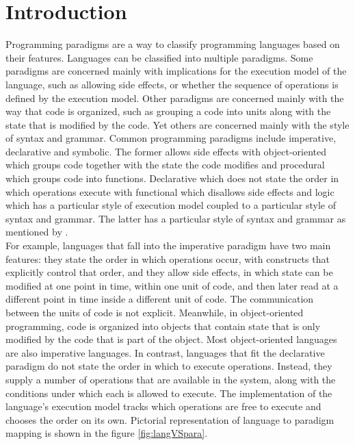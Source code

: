 \documentclass{sig-alternate}
\begin{document}
	\section{Introduction}
	Programming paradigms are a way to classify programming languages based on their features. Languages can be classified into multiple paradigms. Some paradigms are concerned mainly with implications for the execution model of the language, such as allowing side effects, or whether the sequence of operations is defined by the execution model. Other paradigms are concerned mainly with the way that code is organized, such as grouping a code into units along with the state that is modified by the code. Yet others are concerned mainly with the style of syntax and grammar. Common programming paradigms include imperative, declarative and symbolic. The former allows side effects with object-oriented which groups code together with the state the code modifies and procedural which groups code into functions. Declarative which does not state the order in which operations execute with functional which disallows side effects and logic which has a particular style of execution model coupled to a particular style of syntax and grammar. The latter has a particular style of syntax and grammar as mentioned by \cite{kurt2012,Frans2012}.\\
For example, languages that fall into the imperative paradigm have two main features: they state the order in which operations occur, with constructs that explicitly control that order, and they allow side effects, in which state can be modified at one point in time, within one unit of code, and then later read at a different point in time inside a different unit of code. The communication between the units of code is not explicit. Meanwhile, in object-oriented programming, code is organized into objects that contain state that is only modified by the code that is part of the object. Most object-oriented languages are also imperative languages. In contrast, languages that fit the declarative paradigm do not state the order in which to execute operations. Instead, they supply a number of operations that are available in the system, along with the conditions under which each is allowed to execute. The implementation of the language's execution model tracks which operations are free to execute and chooses the order on its own. Pictorial representation of language to paradigm mapping is shown in the figure \ref{fig:langVSpara}.\\
\end{document}
